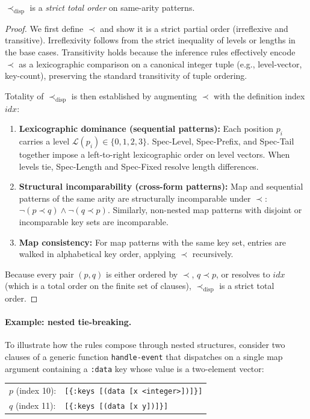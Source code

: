\documentclass[sigconf,nonacm]{acmart}
\begin{document}
\begin{lemma}[Totality]
$\prec_{\text{disp}}$ is a \textit{strict total order} on same-arity patterns.
\end{lemma}
\begin{proof}
We first define $\prec$ and show it is a strict partial order (irreflexive and transitive). Irreflexivity follows from the strict inequality of levels or lengths in the base cases. Transitivity holds because the inference rules effectively encode $\prec$ as a lexicographic comparison on a canonical integer tuple (e.g., level-vector, key-count), preserving the standard transitivity of tuple ordering.

Totality of $\prec_{\text{disp}}$ is then established by augmenting $\prec$ with the definition index $\textit{idx}$:
\begin{enumerate}
    \item \textbf{Lexicographic dominance (sequential patterns):} Each position $p_i$ carries a level $\mathcal{L}(p_i) \in \{0,1,2,3\}$. Spec-Level, Spec-Prefix, and Spec-Tail together impose a left-to-right lexicographic order on level vectors. When levels tie, Spec-Length and Spec-Fixed resolve length differences.
    \item \textbf{Structural incomparability (cross-form patterns):} Map and sequential patterns of the same arity are structurally incomparable under $\prec$: $\neg(p \prec q) \land \neg(q \prec p)$. Similarly, non-nested map patterns with disjoint or incomparable key sets are incomparable. 
    \item \textbf{Map consistency:} For map patterns with the same key set, entries are walked in alphabetical key order, applying $\prec$ recursively.
\end{enumerate}
Because every pair $(p, q)$ is either ordered by $\prec$, $q \prec p$, or resolves to $\textit{idx}$ (which is a total order on the finite set of clauses), $\prec_{\text{disp}}$ is a strict total order.
\end{proof}

\paragraph{Example: nested tie-breaking.}
To illustrate how the rules compose through nested structures, consider two clauses of a generic function \texttt{handle-event} that dispatches on a single map argument containing a \texttt{:data} key whose value is a two-element vector:

\smallskip
\begin{center}
\small
\begin{tabular}{ll}
$p$ (index 10): & \texttt{[\{:keys [(data [x <integer>])]\}]} \\
$q$ (index 11): & \texttt{[\{:keys [(data [x y])]\}]} \\
\end{tabular}
\end{center}
\smallskip
\end{document}
